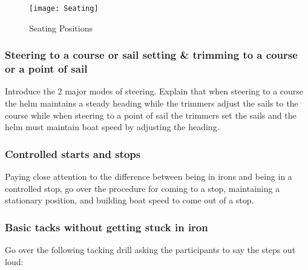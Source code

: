 \documentclass[12pt]{scrartcl}
\begin{document}
\label{fig:seating}
\begin{figure}[H]
	\centering
	\texttt{[image: Seating]}
	\caption{Seating Positions}
\end{figure}

\subsubsection{Steering to a course or sail setting \& trimming to a course or a point of sail} \label{subsubsec:steering and trimming}

Introduce the 2 major modes of steering. Explain that when steering to a course the helm maintains a steady heading while the trimmers adjust the sails to the course while when steering to a point of sail the trimmers set the sails and the helm must maintain boat speed by adjusting the heading.

\subsubsection{Controlled starts and stops} \label{subsubsec:controlled starts and stops}

Paying close attention to the difference between being in irons and being in a controlled stop, go over the procedure for coming to a stop, maintaining a stationary position, and building boat speed to come out of a stop.

\subsubsection{Basic tacks without getting stuck in iron} \label{subsubsec:basic tacks}

Go over the following tacking drill asking the participants to say the steps out loud:
\end{document}
